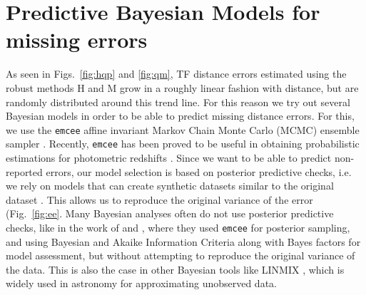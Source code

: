\documentclass[a4paper,fleqn,usenatbib]{mnras}
\begin{document}
\section{Predictive Bayesian Models for missing errors}
\label{sec:predbay} %

As seen in Figs.~\ref{fig:hqp} and \ref{fig:qm}, TF distance errors estimated using the robust methods H and M grow in a roughly linear fashion with distance, but are randomly distributed around this trend line. For this reason we try out several Bayesian models in order to be able to predict missing distance errors. For this, we use the \texttt{emcee} affine invariant Markov Chain Monte Carlo (MCMC) ensemble sampler \citep{emcee}. Recently, \texttt{emcee} has been proved to be useful in obtaining probabilistic estimations for photometric redshifts \citet{photred1,photred2}. Since we want to be able to predict non-reported errors, our model selection is based on posterior predictive checks, i.e. we rely on models that can create synthetic datasets similar to the original dataset \citep{gelmanppd}. This allows us to reproduce the original variance of the error (Fig.~\ref{fig:ee}. Many Bayesian analyses often do not use posterior predictive checks, like in the work of \citet{propprob2018} and \citet{bayesh}, where they used \texttt{emcee} for posterior sampling, and using Bayesian and Akaike Information Criteria along with Bayes factors for model assessment, but without attempting to reproduce the original variance of the data. This is also the case in other Bayesian tools like LINMIX  \citep{gmastro}, which is widely used in astronomy for approximating unobserved data.  \\
\end{document}
